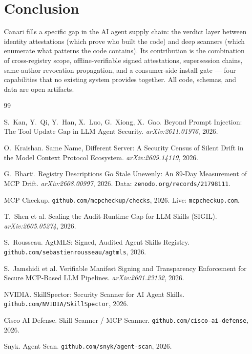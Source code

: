 \documentclass[11pt,a4paper]{article}
\begin{document}
\section{Conclusion}

Canari fills a specific gap in the AI agent supply chain: the verdict layer
between identity attestations (which prove who built the code) and deep
scanners (which enumerate what patterns the code contains). Its contribution
is the combination of cross-registry scope, offline-verifiable signed
attestations, supersession chains, same-author revocation propagation, and a
consumer-side install gate --- four capabilities that no existing system
provides together. All code, schemas, and data are open artifacts.


\begin{thebibliography}{99}

 S.~Kan, Y.~Qi, Y.~Han, X.~Luo, G.~Xiong, X.~Gao.
Beyond Prompt Injection: The Tool Update Gap in LLM Agent Security.
\emph{arXiv:2611.01976}, 2026.

 O.~Kraishan.
Same Name, Different Server: A Security Census of Silent Drift in the Model Context Protocol Ecosystem.
\emph{arXiv:2609.14119}, 2026.

 G.~Bharti.
Registry Descriptions Go Stale Unevenly: An 89-Day Measurement of MCP Drift.
\emph{arXiv:2608.00997}, 2026. Data: \texttt{zenodo.org/records/21798111}.

 MCP Checkup.
\texttt{github.com/mcpcheckup/checks}, 2026. Live: \texttt{mcpcheckup.com}.

 T.~Shen et al.
Sealing the Audit-Runtime Gap for LLM Skills (SIGIL).
\emph{arXiv:2605.05274}, 2026.

 S.~Rousseau.
AgtMLS: Signed, Audited Agent Skills Registry.
\texttt{github.com/sebastienrousseau/agtmls}, 2026.

 S.~Jamshidi et al.
Verifiable Manifest Signing and Transparency Enforcement for Secure MCP-Based LLM Pipelines.
\emph{arXiv:2601.23132}, 2026.

 NVIDIA.
SkillSpector: Security Scanner for AI Agent Skills.
\texttt{github.com/NVIDIA/SkillSpector}, 2026.

 Cisco AI Defense.
Skill Scanner / MCP Scanner.
\texttt{github.com/cisco-ai-defense}, 2026.

 Snyk.
Agent Scan.
\texttt{github.com/snyk/agent-scan}, 2026.


\end{thebibliography}
\end{document}

